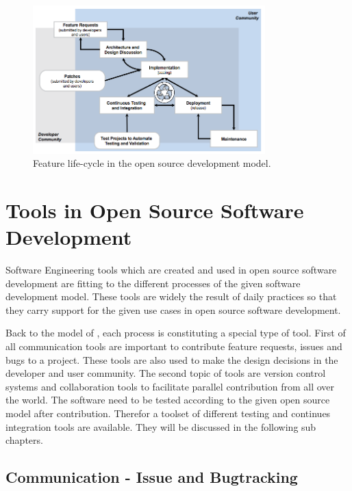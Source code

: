 \documentclass[DIV=calc,paper=a4,fontsize=9pt,twocolumn]{scrartcl}
\begin{document}
\begin{figure}[ht]
    \includegraphics[width=0.8\textwidth ]{img/feature-life-cycle.png}{}
    \centering
    \caption{Feature life-cycle in the open source development model. \citet{Haddad11}}\label{fig:feature-life-cycle}
\end{figure}

\section{Tools in Open Source Software Development}

Software Engineering tools which are created and used in open source software development are fitting to the different processes of the given software development model. These tools are widely the result of daily practices so that they carry support for the given use cases in open source software development. \citep{Robbins02adoptingoss} 

Back to the model of \citet{Haddad11}, each process is constituting a special type of tool. First of all communication tools are important to contribute feature requests, issues and bugs to a project. These tools are also used to make the design decisions in the developer and user community. The second topic of tools are version control systems and collaboration tools to facilitate parallel contribution from all over the world. The software need to be tested according to the given open source model after contribution. Therefor a toolset of different testing and continues integration tools are available. They will be discussed in the following sub chapters.

\subsection{Communication - Issue and Bugtracking}
\end{document}
